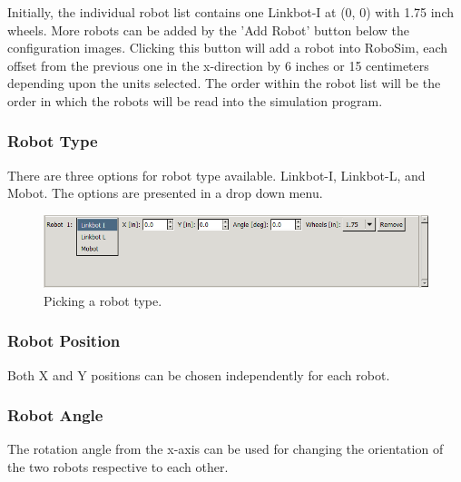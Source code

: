 \documentclass{article}
\begin{document}
Initially, the individual robot list contains one Linkbot-I at (0, 0) with 1.75
inch wheels.  More robots can be added by the 'Add Robot' button below the
configuration images.  Clicking this button will add a robot into RoboSim, each
offset from the previous one in the x-direction by 6 inches or 15 centimeters
depending upon the units selected.  The order within the robot list will be the
order in which the robots will be read into the simulation program.

\subsubsection{Robot Type}
There are three options for robot type available.  Linkbot-I, Linkbot-L,
and Mobot.  The options are presented in a drop down menu.
\begin{figure}[H]
	\begin{center}
		\includegraphics[width=6in]{images/type}
	\end{center}
	\caption{Picking a robot type.}
	\label{fig:type}
\end{figure}

\subsubsection{Robot Position}
Both X and Y positions can be chosen independently for each robot.

\subsubsection{Robot Angle}
The rotation angle from the x-axis can be used for changing the orientation of
the two robots respective to each other. 
\end{document}
